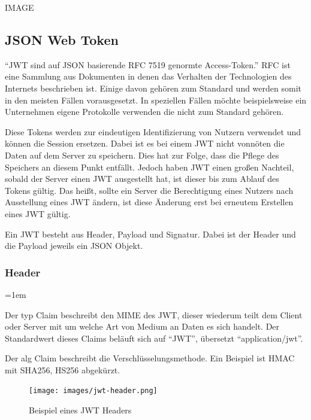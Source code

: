 \documentclass[paper=a4,fontsize=12pt,parskip=half]{scrartcl}
\begin{document}
	IMAGE

	\subsection{JSON Web Token}
	\label{sec: jwt}
	\enquote{\gls{JWT} sind auf \gls{JSON} basierende \gls{RFC} 7519 genormte Access-Token.} \gls{RFC} ist eine Sammlung aus Dokumenten in denen das Verhalten der Technologien des Internets beschrieben ist. Einige davon gehören zum Standard und werden somit in den meisten Fällen vorausgesetzt. In speziellen Fällen möchte beispielsweise ein Unternehmen eigene Protokolle verwenden die nicht zum Standard gehören.

	Diese Tokens werden zur eindeutigen Identifizierung von Nutzern verwendet und können die Session ersetzen. Dabei ist es bei einem \gls{JWT} nicht vonnöten die Daten auf dem Server zu speichern. Dies hat zur Folge, dass die Pflege des Speichers an diesem Punkt entfällt. Jedoch haben \gls{JWT} einen großen Nachteil, sobald der Server einen \gls{JWT} ausgestellt hat, ist dieser bis zum Ablauf des Tokens gültig. Das heißt, sollte ein Server die Berechtigung eines Nutzers nach Ausstellung eines \gls{JWT} ändern, ist diese Änderung erst bei erneutem Erstellen eines \gls{JWT} gültig.

	Ein \gls{JWT} besteht aus Header, Payload und Signatur. Dabei ist der Header und die Payload jeweils ein \gls{JSON} Objekt.

	\subsubsection{Header}
	\label{sec: jwt_header}

	\begin{description}
		\leftskip=1em
		\item[typ] Der typ Claim beschreibt den \gls{MIME} des \gls{JWT}, dieser wiederum teilt dem Client oder Server mit um welche Art von Medium an Daten es sich handelt. Der Standardwert dieses Claims beläuft sich auf \enquote{JWT}, übersetzt \enquote{application/jwt}.
		\item[alg] Der alg Claim beschreibt die Verschlüsselungsmethode. Ein Beispiel ist \gls{HMAC} mit \gls{SHA256}, HS256 abgekürzt.
	\end{description}

	\begin{figure}[h]
		\texttt{[image: images/jwt-header.png]}
		\caption{Beispiel eines \gls{JWT} Headers }
		\label{fig:jwt-header}
	\end{figure}
\end{document}
